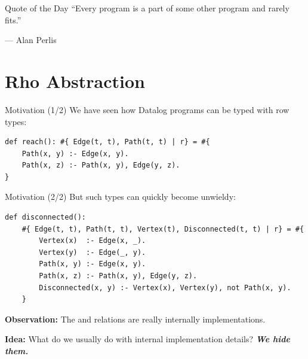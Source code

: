 \begin{frame}{Quote of the Day}
``Every program is a part of some other program and rarely fits.''

\begin{flushright}
--- Alan Perlis
\end{flushright}
\end{frame}



\section{Rho Abstraction}

\begin{frame}[fragile]{Motivation (1/2)}
We have seen how Datalog programs can be typed with row types:
%
\begin{lstlisting}[language=flix, xleftmargin=0.8cm]
def reach(): #{ Edge(t, t), Path(t, t) | r} = #{
    Path(x, y) :- Edge(x, y).
    Path(x, z) :- Path(x, y), Edge(y, z).
}
\end{lstlisting}
\end{frame}

\begin{frame}[fragile]{Motivation (2/2)}
But such types can quickly become unwieldy:
%
\begin{lstlisting}[language=flix, xleftmargin=0.8cm]
def disconnected(): 
    #{ Edge(t, t), Path(t, t), Vertex(t), Disconnected(t, t) | r} = #{
        Vertex(x)  :- Edge(x, _).
        Vertex(y)  :- Edge(_, y).
        Path(x, y) :- Edge(x, y).
        Path(x, z) :- Path(x, y), Edge(y, z).
        Disconnected(x, y) :- Vertex(x), Vertex(y), not Path(x, y).
    }
\end{lstlisting}

\textbf{Observation:} The  and  relations are really
internally implementations.

\textbf{Idea:} What do we usually do with internal implementation details? \textbf{\emph{We hide them.}}
\end{frame}

